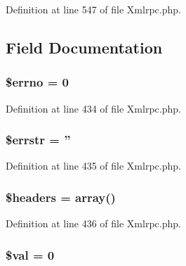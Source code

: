 Definition at line 547 of file Xmlrpc.\-php.



\subsection{Field Documentation}
\hypertarget{class_x_m_l___r_p_c___response_a2be10a914e39a6b1f855ddf3b9a21367}{
\subsubsection[{\$errno}]{\setlength{\rightskip}{0pt plus 5cm}\$errno = 0}}\label{class_x_m_l___r_p_c___response_a2be10a914e39a6b1f855ddf3b9a21367}


Definition at line 434 of file Xmlrpc.\-php.

\hypertarget{class_x_m_l___r_p_c___response_a126a4369646afcf007816bfa8c208d11}{
\subsubsection[{\$errstr}]{\setlength{\rightskip}{0pt plus 5cm}\$errstr = ''}}\label{class_x_m_l___r_p_c___response_a126a4369646afcf007816bfa8c208d11}


Definition at line 435 of file Xmlrpc.\-php.

\hypertarget{class_x_m_l___r_p_c___response_a52500036ee807241b8b4b7e2367c49ef}{
\subsubsection[{\$headers}]{\setlength{\rightskip}{0pt plus 5cm}\$headers = array()}}\label{class_x_m_l___r_p_c___response_a52500036ee807241b8b4b7e2367c49ef}


Definition at line 436 of file Xmlrpc.\-php.

\hypertarget{class_x_m_l___r_p_c___response_aac81a74a7b30767af29bfd9a695636df}{
\subsubsection[{\$val}]{\setlength{\rightskip}{0pt plus 5cm}\$val = 0}}\label{class_x_m_l___r_p_c___response_aac81a74a7b30767af29bfd9a695636df}


